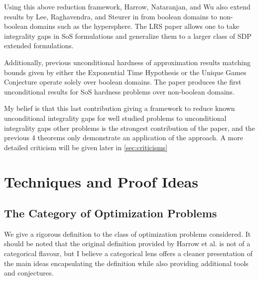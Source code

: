 \documentclass[runningheads,a4paper,english]{llncs}[2022/01/12]
\begin{document}
Using this above reduction framework, Harrow, Nataranjan, and Wu also extend results by Lee, Raghavendra, and Steurer in \cite{lee2014lowerboundssizesemidefinite} from boolean domains to non-boolean domains such as the hypersphere. The LRS paper allows one to take integrality gaps in SoS formulations and generalize them to a larger class of SDP extended formulations.

Additionally, previous unconditional hardness of approximation results \cite{tulsiani2009csp,odonnell2014hardnessrobustgraphisomorphism} matching bounds given by either the Exponential Time Hypothesis or the Unique Games Conjecture operate solely over boolean domains.
The paper produces the first unconditional results for SoS hardness problems over non-boolean domains.

My belief is that this last contribution giving a framework to reduce known unconditional integrality gaps for well studied problems to unconditional integrality gaps other problems is the strongest contribution of the paper, and the previous 4 theorems only demonstrate an application of the approach.
A more detailed criticism will be given later in \cref{sec:criticisms}

\section{Techniques and Proof Ideas}
\label{sec:techniques}

\subsection{The Category of Optimization Problems}
\label{sec:optimizationdef}
We give a rigorous definition to the class of optimization problems considered. 
It should be noted that the original definition provided by Harrow et al. is not of a categorical flavour, but I believe a categorical lens offers a cleaner presentation of the main ideas encapsulating the definition while also providing additional tools and conjectures.
\end{document}
